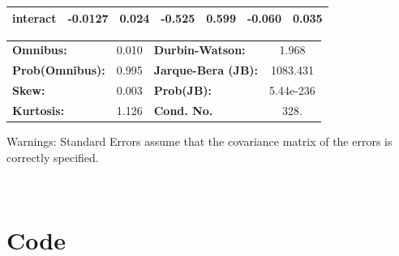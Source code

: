 \documentclass{article}
\begin{document}
\begin{enumerate}[label=\alph*]
\begin{center}
\begin{tabular}{lcccccc}
\textbf{interact} &      -0.0127  &        0.024     &    -0.525  &         0.599        &       -0.060    &        0.035     \\
\bottomrule
\end{tabular}
\begin{tabular}{lclc}
\textbf{Omnibus:}       &  0.010 & \textbf{  Durbin-Watson:     } &     1.968  \\
\textbf{Prob(Omnibus):} &  0.995 & \textbf{  Jarque-Bera (JB):  } &  1083.431  \\
\textbf{Skew:}          &  0.003 & \textbf{  Prob(JB):          } & 5.44e-236  \\
\textbf{Kurtosis:}      &  1.126 & \textbf{  Cond. No.          } &      328.  \\
\bottomrule
\end{tabular}
\end{center}

Warnings: \newline
 [1] Standard Errors assume that the covariance matrix of the errors is correctly specified.

​



\end{enumerate}


\section{Code}
\end{document}
